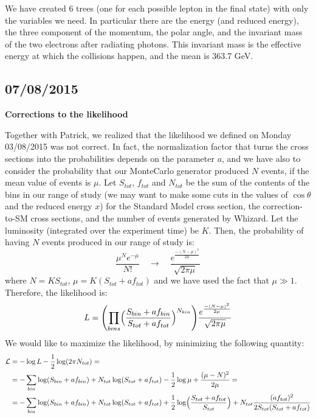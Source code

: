 We have created 6 trees (one for each possible lepton in the final state) with only the variables we need. In particular there are the energy (and reduced energy), the three component of the momentum, the polar angle, and the invariant mass of the two electrons after radiating photons. This invariant mass is the effective energy at which the collisions happen, and the mean is 363.7 GeV. 

\subsection{07/08/2015}

\textbf{Corrections to the likelihood}

Together with Patrick, we realized that the likelihood we defined on Monday 03/08/2015 was not correct. In fact, the normalization factor that turns the cross sections into the probabilities depends on the parameter $a$, and we have also to consider the probability that our MonteCarlo generator produced $N$ events, if the mean value of events is $\mu$.
Let $S_{tot}$, $f_{tot}$ and $N_{tot}$ be the sum of the contents of the bins in our range of study (we may want to make some cuts in the values of $\cos\theta$ and the reduced energy $x$) for the Standard Model cross section, the correction-to-SM cross sections, and the number of events generated by Whizard. Let the luminosity (integrated over the experiment time) be $K$. Then, the probability of having $N$ events produced in our range of study is:
\[
\frac{\mu^Ne^{-\mu}}{N!} \quad\rightarrow\quad \frac{e^{\frac{-(N-\mu)^2}{2\mu}}}{\sqrt{2\pi\mu}}
\]
where $N=KS_{tot}$, $\mu = K(S_{tot}+af_{tot})$ and we have used the fact that $\mu \gg 1$.
Therefore, the likelihood is:
\[
L = \Biggl(\prod_{bins}\Bigl(\frac{S_{bin}+af_{bin}}{S_{tot}+af_{tot}}\Bigr)^{N_{bin}}\Biggr)\frac{e^{\frac{-(N-\mu)^2}{2\mu}}}{\sqrt{2\pi\mu}}
\]
We would like to maximize the likelihood, by minimizing the following quantity:
\begin{equation}
\begin{split}
\mathcal{L} &= -\log L -\frac{1}{2}\log(2\pi N_{tot}) =\\
&=- \sum_{bin}\log(S_{bin}+af_{bin})+N_{tot}\log(S_{tot}+af_{tot})-\frac{1}{2}\log\mu+\frac{(\mu-N)^2}{2\mu} =\\
&=- \sum_{bin}\log(S_{bin}+af_{bin})+N_{tot}\log(S_{tot}+af_{tot})+\frac{1}{2}\log\Bigl(\frac{S_{tot}+af_{tot}}{S_{tot}}\Bigr)+N_{tot}\frac{(af_{tot})^2}{2S_{tot}(S_{tot}+af_{tot})}
\end{split}
\end{equation}

